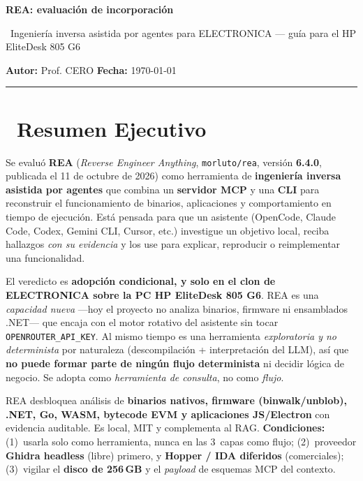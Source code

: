 \documentclass[11pt,a4paper]{article}
\newcommand{\iconoBanda}{microchip}
\newcommand{\bandaTitulo}[3][fondoOscuro]{%
  \begin{tcolorbox}[
    enhanced,
    colback=#1, colframe=#1,
    boxrule=0pt, arc=8pt, outer arc=8pt,
    width=\linewidth,
    top=18pt, bottom=6pt, left=14pt, right=14pt,
    borderline south={3.5pt}{0pt}{cyanNeon},
  ]
    \begin{minipage}[c]{0.07\linewidth}
      \centering
      \textcolor{cyanNeon}{\fontsize{30}{30}\selectfont\faIcon{\iconoBanda}}
    \end{minipage}%
    \hspace{8pt}%
    \begin{minipage}[c]{0.88\linewidth}
      {\fontsize{20}{24}\selectfont\bfseries\color{white}#2}\par\vspace{5pt}%
      \textcolor{cyanNeon!80!white}{\small\faIcon{angle-right}~#3}%
    \end{minipage}
    \vspace{4pt}
  \end{tcolorbox}%
  \vspace{8pt}%
}
\newcommand{\iconotexto}[2]{\textcolor{cyanNeon}{\faIcon{#1}}~#2}
\renewcommand{\iconoBanda}{search}
\begin{document}
\bandaTitulo{REA: evaluación de incorporación}{Ingeniería inversa asistida por agentes para ELECTRONICA --- guía para el HP EliteDesk 805 G6}

\begin{center}
  \vspace{2pt}
  {\large \textbf{Autor:} Prof. CERO \hfill \textbf{Fecha:} \today} \\[6pt]
  \color{cyanNeon}\rule{\linewidth}{0.4pt}
\end{center}

\tableofcontents
\newpage

\section[Resumen Ejecutivo]{\iconotexto{info-circle}{Resumen Ejecutivo}}

Se evaluó \textbf{REA} (\emph{Reverse Engineer Anything}, \texttt{morluto/rea},
versión \textbf{6.4.0}, publicada el 11 de octubre de 2026) como herramienta de
\textbf{ingeniería inversa asistida por agentes} que combina un \textbf{servidor MCP} y
una \textbf{CLI} para reconstruir el funcionamiento de binarios, aplicaciones y
comportamiento en tiempo de ejecución. Está pensada para que un asistente (OpenCode,
Claude Code, Codex, Gemini CLI, Cursor, etc.) investigue un objetivo local, reciba
hallazgos \emph{con su evidencia} y los use para explicar, reproducir o reimplementar una
funcionalidad.

El veredicto es \textbf{adopción condicional, y solo en el clon de ELECTRONICA sobre la
PC HP EliteDesk 805 G6}. REA es una \emph{capacidad nueva} —hoy el proyecto no
analiza binarios, firmware ni ensamblados .NET— que encaja con el motor rotativo del
asistente sin tocar \texttt{OPENROUTER\_API\_KEY}. Al mismo tiempo es una herramienta
\emph{exploratoria y no determinista} por naturaleza (descompilación + interpretación del
LLM), así que \textbf{no puede formar parte de ningún flujo determinista} ni decidir
lógica de negocio. Se adopta como \emph{herramienta de consulta}, no como \emph{flujo}.

\begin{tcolorbox}[cajaFortaleza, title={\faIcon{thumbs-up}~Veredicto rápido: SÍ, adoptable, con condiciones}]
REA desbloquea análisis de \textbf{binarios nativos, firmware (binwalk/unblob), .NET, Go,
WASM, bytecode EVM y aplicaciones JS/Electron} con evidencia auditable. Es local, MIT y
complementa al RAG. \textbf{Condiciones:} (1)~usarla solo como herramienta, nunca en las
3~capas como flujo; (2)~proveedor \textbf{Ghidra headless} (libre) primero, y \textbf{Hopper
/ IDA diferidos} (comerciales); (3)~vigilar el \textbf{disco de 256\,GB} y el \emph{payload}
de esquemas MCP del contexto.
\end{tcolorbox}
\end{document}
